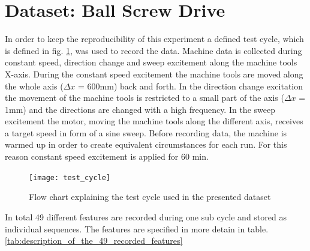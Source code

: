 \section{Dataset: Ball Screw Drive}
In order to keep the reproducibility of this experiment a defined test cycle, which is defined in fig. \ref{fig:test_cycle}, was used to record the data. Machine data is collected during constant speed, direction change and sweep excitement along the machine tools X-axis. During the constant speed excitement the machine tools are moved along the whole axis  ($\Delta x$ = 600mm) back and forth. In the direction change excitation the movement of the machine tools is restricted to a small part of the axis ($\Delta x$ = 1mm) and the directions are changed with a high frequency. In the sweep excitement the motor, moving the machine tools along the different axis, receives a target speed in form of a sine sweep. Before recording data, the machine is warmed up in order to create equivalent circumstances for each run. For this reason constant speed excitement is applied for 60 min. 


\begin{figure}[htpb]
  \centering
  \texttt{[image: test\_cycle]}
  \caption {Flow chart explaining the test cycle used in the presented dataset}
  \label{fig:test_cycle}
\end{figure}

In total 49 different features are recorded during one sub cycle and stored as individual sequences. The features are specified in more detain in table. \ref{tab:description_of_the_49_recorded_features}

